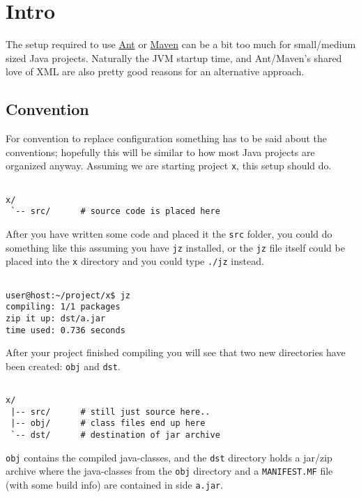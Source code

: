 
\section{ Intro }

The setup required to use  \href{http://ant.apache.org}{Ant} or
 \href{http://maven.apache.org}{Maven} can be a bit too much for
small/medium sized Java projects. Naturally the JVM startup time,
and Ant/Maven's shared love of XML are also pretty good reasons
for an alternative approach.




\subsection{ Convention }

For convention to replace configuration something has to be said about
the conventions; hopefully this will be similar to how most Java projects
are organized anyway. Assuming we are starting project \texttt{x}, this setup
should do.


{\small
\begin{verbatim}

x/
 `-- src/      # source code is placed here

\end{verbatim}
}


After you have written some code and placed it the \texttt{src} folder, you
could do something like this assuming you have \texttt{jz} installed, or the
\texttt{jz} file itself could be placed into the \texttt{x} directory and you could
type \texttt{./jz} instead.


{\small
\begin{verbatim}

user@host:~/project/x$ jz
compiling: 1/1 packages
zip it up: dst/a.jar
time used: 0.736 seconds

\end{verbatim}
}


After your project finished compiling you will see that two new directories
have been created: \texttt{obj} and \texttt{dst}.


{\small
\begin{verbatim}

x/
 |-- src/      # still just source here..
 |-- obj/      # class files end up here
 `-- dst/      # destination of jar archive

\end{verbatim}
}


\texttt{obj} contains the compiled java-classes, and the \texttt{dst} directory holds a
jar/zip archive where the java-classes from the \texttt{obj} directory and a
\texttt{MANIFEST.MF} file (with some build info) are contained in side \texttt{a.jar}.



